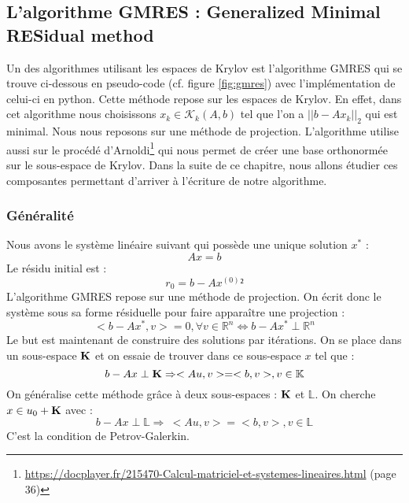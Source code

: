 \subsection{L'algorithme GMRES : Generalized Minimal RESidual method}
Un des algorithmes utilisant les espaces de Krylov est l'algorithme GMRES qui se trouve ci-dessous en pseudo-code (cf. figure \ref{fig:gmres}) avec l'implémentation de celui-ci en python. Cette méthode repose sur les espaces de Krylov. En effet, dans cet algorithme nous choisissons $x_k \in \mathcal{K}_k(A, b)$ tel que l'on a $||b - Ax_k||_2$ qui est minimal. Nous nous reposons sur une méthode de projection. L'algorithme utilise aussi sur le procédé d'Arnoldi\footnote{\url{https://docplayer.fr/215470-Calcul-matriciel-et-systemes-lineaires.html} (page 36)} qui nous permet de créer une base orthonormée sur le sous-espace de Krylov. Dans la suite de ce chapitre, nous allons étudier ces composantes permettant d'arriver à l'écriture de notre algorithme.

\subsubsection{Généralité}
Nous avons le système linéaire suivant qui possède une unique solution $x^*$ : 
\begin{equation}
	Ax = b
\end{equation}
Le résidu initial est  : 
\begin{equation}
r_0 = b - A x^{(0)}²
\end{equation}
L'algorithme GMRES repose sur une méthode de projection. On écrit donc le système sous sa forme résiduelle pour faire apparaître une projection : 
\begin{equation}
< b - Ax^*, v > = 0, \forall v \in \mathbb{R}^n \Leftrightarrow b - Ax^* \perp \mathbb{R}^n
\label{pb_res}
\end{equation}
Le but est maintenant de construire des solutions par itérations. On se place dans un sous-espace $\mathbf{K}$ et on essaie de trouver dans ce sous-espace $x$ tel que : 
\begin{equation}
b - Ax \perp \mathbf{K} \Rightarrow <Au, v> = <b, v>, v \in \mathbb{K}
\end{equation}
On généralise cette méthode grâce à deux sous-espaces : $\mathbf{K}$ et  $\mathbb{L}$. On cherche $x \in u_0 + \mathbf{K}$ avec :
\begin{equation}
b - Ax \perp \mathbb{L} \Rightarrow \ <Au, v> = <b, v>, v \in \mathbb{L}
\label{Petrov-Galerkin}
\end{equation}
C'est la condition de Petrov-Galerkin.

